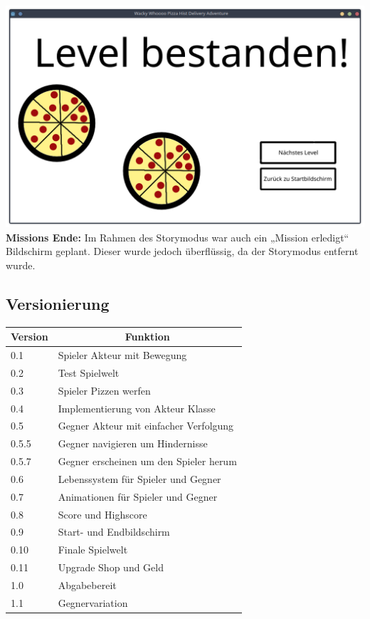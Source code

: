 \documentclass{article}
\begin{document}
	\includegraphics[width=\textwidth]{end.png}
	\textbf{Missions Ende:}
	Im Rahmen des Storymodus war auch ein „Mission erledigt“ Bildschirm geplant. Dieser wurde jedoch überflüssig, da der Storymodus entfernt wurde.
	
	\newpage
	\subsection{Versionierung}
	\begin{table}[h]
		\begin{tabular}{|l|l|}
			\hline
			\textbf{Version} & \multicolumn{1}{c|}{\textbf{Funktion}}  \\ \hline
			0.1              & Spieler Akteur mit Bewegung            \\ \hline
			0.2              & Test Spielwelt                         \\ \hline
			0.3              & Spieler Pizzen werfen                  \\ \hline
			0.4              & Implementierung von Akteur Klasse      \\ \hline
			0.5              & Gegner Akteur mit einfacher Verfolgung \\ \hline
			0.5.5            & Gegner navigieren um Hindernisse       \\ \hline
			0.5.7            & Gegner erscheinen um den Spieler herum \\ \hline
			0.6              & Lebenssystem für Spieler und Gegner    \\ \hline
			0.7              & Animationen für Spieler und Gegner     \\ \hline
			0.8              & Score und Highscore                    \\ \hline
			0.9              & Start- und Endbildschirm               \\ \hline
			0.10             & Finale Spielwelt                       \\ \hline
			0.11             & Upgrade Shop und Geld                  \\ \hline
			1.0              & Abgabebereit                           \\ \hline
			1.1              & Gegnervariation                        \\ \hline
		\end{tabular}
	\end{table}
	
\end{document}
